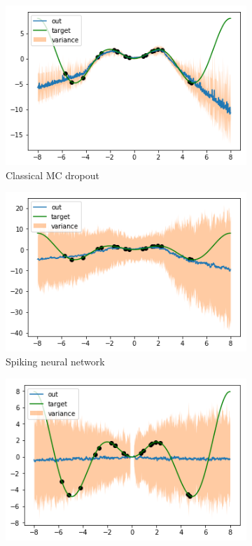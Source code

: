 \documentclass[10pt,a4paper,twocolumn]{article}
\begin{document}
\begin{figure}[t]
\centering
\begin{subfigure}[t]{0.3\textwidth}
\centering
\includegraphics[width=\linewidth]{gal_uncertainty4.png}
\caption{Classical MC dropout}\label{subfig:exp1_mc}
\end{subfigure}
\begin{subfigure}[t]{0.3\textwidth}
\centering
\includegraphics[width=\linewidth]{spiking_uncertainty2.png}
\caption{Spiking neural network}\label{subfig:exp1_spike}
\end{subfigure}
\begin{subfigure}[t]{0.3\textwidth}
\centering
\includegraphics[width=\linewidth]{random_uncertainty.png}

\end{subfigure}
\end{figure}
\end{document}
